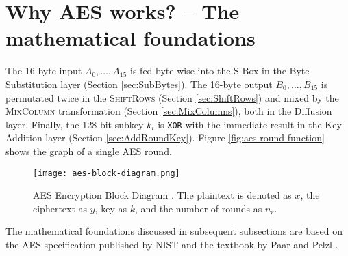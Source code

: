\section{Why AES works? -- The mathematical foundations}
\label{sec:why}
\label{sec:math}

The 16-byte input $A_0, \dots, A_{15}$ is fed byte-wise into the S-Box in the Byte Substitution layer (Section \ref{sec:SubBytes}).
The 16-byte output $B_0, \dots, B_{15}$ is permutated twice in the \textsc{ShiftRows} (Section \ref{sec:ShiftRows}) and mixed by the \textsc{MixColumn} transformation (Section \ref{sec:MixColumns}), both in the Diffusion layer.
Finally, the 128-bit subkey $k_i$ is \texttt{XOR} with the immediate result in the Key Addition layer (Section \ref{sec:AddRoundKey}).
Figure \ref{fig:aes-round-function} shows the graph of a single AES round. 

\begin{figure}[!ht]
    \centering
    \texttt{[image: aes-block-diagram.png]}
    \caption{
        AES Encryption Block Diagram \cite{Paar2024}.
        The plaintext is denoted as $x$, the ciphertext as $y$, key as $k$, and the number of rounds as $n_r$.
    }
    \label{fig:aes-block-diagram}
\end{figure}

The mathematical foundations discussed in subsequent subsections are based on the \gls{AES} specification published by \gls{NIST} \cite{NIST_AES} and the textbook by Paar and Pelzl \cite{Paar2024}.








\newpage

